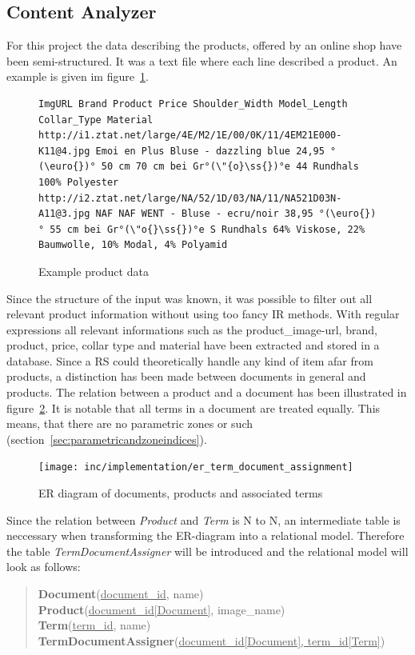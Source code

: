 \subsection{Content Analyzer}
For this project the data describing the products, offered by an online shop have been semi-structured.
It was a text file where each line described a product.
An example is given im figure~\ref{fig:productdata}.
\begin{figure}[h]
\begin{lstlisting}
ImgURL Brand Product Price Shoulder_Width Model_Length Collar_Type Material
http://i1.ztat.net/large/4E/M2/1E/00/0K/11/4EM21E000-K11@4.jpg Emoi en Plus Bluse - dazzling blue 24,95 °(\euro{})° 50 cm 70 cm bei Gr°(\"{o}\ss{})°e 44 Rundhals 100% Polyester
http://i2.ztat.net/large/NA/52/1D/03/NA/11/NA521D03N-A11@3.jpg NAF NAF WENT - Bluse - ecru/noir 38,95 °(\euro{})° 55 cm bei Gr°(\"o{}\ss{})°e S Rundhals 64% Viskose, 22% Baumwolle, 10% Modal, 4% Polyamid
\end{lstlisting}
    \caption{Example product data}
    \label{fig:productdata}
\end{figure}
Since the structure of the input was known, it was possible to filter out all relevant product information without using too fancy IR methods.
With regular expressions all relevant informations such as the product\_image-url, brand, product, price, collar type and material have been extracted and stored in a database.
Since a RS could theoretically handle any kind of item afar from products, a distinction has been made between documents in general and products.
The relation between a product and a document has been illustrated in figure~\ref{fig:ertermdocumentassignment}.
It is notable that all terms in a document are treated equally.
This means, that there are no parametric zones or such (section~\ref{sec:parametricandzoneindices}).
\begin{figure}[h]
    \center
    \texttt{[image: inc/implementation/er\_term\_document\_assignment]}
    \caption{ER diagram of documents, products and associated terms}
    \label{fig:ertermdocumentassignment}
\end{figure}
Since the relation between \textit{Product} and \textit{Term} is N to N, an intermediate table is neccessary when transforming the ER-diagram into a relational model.
Therefore the table \textit{TermDocumentAssigner} will be introduced and the relational model will look as follows:

\begin{quote}
    \textbf{Document}{(\underline{document\_id}, name)}\\
    \textbf{Product}{(\underline{document\_id[Document]}, image\_name)}\\
    \textbf{Term}{(\underline{term\_id}, name)}\\
    \textbf{TermDocumentAssigner}{(\underline{document\_id[Document], term\_id[Term]})}\\
\end{quote}




